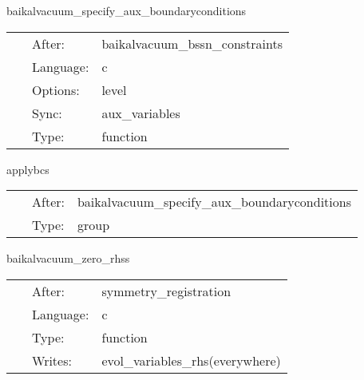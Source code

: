 \vspace{5mm}


\hspace{5mm} baikalvacuum\_specify\_aux\_boundaryconditions 

\hspace{5mm}{\it register boundary conditions and perform amr+interprocessor synchronization } 


\hspace{5mm}

 \begin{tabular*}{160mm}{cll} 
~ & After:  & baikalvacuum\_bssn\_constraints \\ 
~ & Language:  & c \\ 
~ & Options:  & level \\ 
~ & Sync:  & aux\_variables \\ 
~ & Type:  & function \\ 
\end{tabular*} 


\vspace{5mm}


\hspace{5mm} applybcs 

\hspace{5mm}{\it apply registered boundary conditions } 


\hspace{5mm}

 \begin{tabular*}{160mm}{cll} 
~ & After:  & baikalvacuum\_specify\_aux\_boundaryconditions \\ 
~ & Type:  & group \\ 
\end{tabular*} 


\vspace{5mm}


\hspace{5mm} baikalvacuum\_zero\_rhss 

\hspace{5mm}{\it idea from lean: set all rhs functions to zero to prevent spurious nans } 


\hspace{5mm}

 \begin{tabular*}{160mm}{cll} 
~ & After:  & symmetry\_registration \\ 
~ & Language:  & c \\ 
~ & Type:  & function \\ 
~ & Writes:  & evol\_variables\_rhs(everywhere) \\ 
\end{tabular*} 


